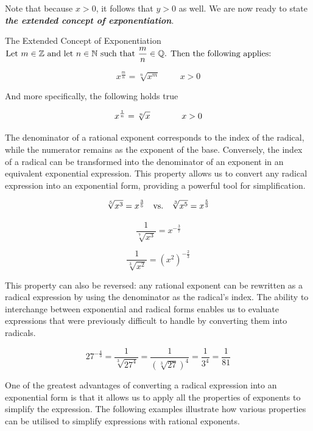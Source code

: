 Note that because \(x > 0\), it follows that \(y > 0\) as well. We are now ready to state \textbf{\textit{the extended concept of exponentiation}}.

\begin{definition}{The Extended Concept of Exponentiation}
$\textnormal{Let } m \in \mathbb{Z} \textnormal{ and let }  n \in \mathbb{N} \textnormal{ such that } \dfrac{m}{n} \in \mathbb{Q}  \textnormal{. Then the following applies:}$

\[
x^{\frac{m}{n}} = \sqrt[n]{x^m} \hspace{1cm} x > 0
\]

\textnormal{And more specifically, the following holds true}

\[
x^{\frac{1}{n}} = \sqrt[n]{x} \hspace{1.3cm} x > 0
\]

\end{definition}

The denominator of a rational exponent corresponds to the index of the radical, while the numerator remains as the exponent of the base. Conversely, the index of a radical can be transformed into the denominator of an exponent in an equivalent exponential expression. This property allows us to convert any radical expression into an exponential form, providing a powerful tool for simplification.

\begin{example}

\[
\sqrt[5]{x^3} = x^{\frac{3}{5}} \quad  \textnormal{vs.} \quad \sqrt[3]{x^5} = x^{\frac{5}{3}}
\]

\[
\frac{1}{\sqrt[7]{x^3}} = x^{-\frac{3}{7}}
\]

\[
\frac{1}{\sqrt[3]{x^2}} = \left(x^2\right)^{-\frac{2}{3}}
\]
\end{example}

This property can also be reversed: any rational exponent can be rewritten as a radical expression by using the denominator as the radical's index. The ability to interchange between exponential and radical forms enables us to evaluate expressions that were previously difficult to handle by converting them into radicals.

\begin{example}
\[
27^{-\frac{4}{3}} = \frac{1}{\sqrt[3]{27^4}} = \frac{1}{\left(\sqrt[3]{27}\right)^4} = \frac{1}{3^4} = \frac{1}{81}
\]    
\end{example}

One of the greatest advantages of converting a radical expression into an exponential form is that it allows us to apply all the properties of exponents to simplify the expression. The following examples illustrate how various properties can be utilised to simplify expressions with rational exponents.

